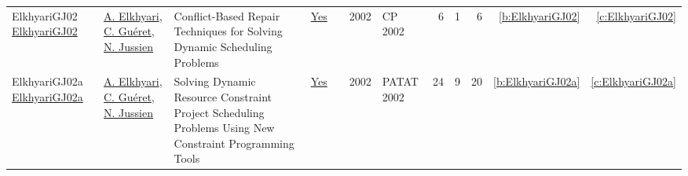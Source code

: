 {\begin{longtable}{>{\raggedright\arraybackslash}p{3cm}>{\raggedright\arraybackslash}p{6cm}>{\raggedright\arraybackslash}p{6.5cm}rrrp{2.5cm}rrrrr}
ElkhyariGJ02 \href{https://doi.org/10.1007/3-540-46135-3\_49}{ElkhyariGJ02} & \hyperref[auth:a295]{A. Elkhyari}, \hyperref[auth:a296]{C. Gu{\'{e}}ret}, \hyperref[auth:a250]{N. Jussien} & Conflict-Based Repair Techniques for Solving Dynamic Scheduling Problems & \href{works/ElkhyariGJ02.pdf}{Yes} & \cite{ElkhyariGJ02} & 2002 & CP 2002 & 6 & 1 & 6 & \ref{b:ElkhyariGJ02} & \ref{c:ElkhyariGJ02}\\
ElkhyariGJ02a \href{https://doi.org/10.1007/978-3-540-45157-0\_3}{ElkhyariGJ02a} & \hyperref[auth:a295]{A. Elkhyari}, \hyperref[auth:a296]{C. Gu{\'{e}}ret}, \hyperref[auth:a250]{N. Jussien} & Solving Dynamic Resource Constraint Project Scheduling Problems Using New Constraint Programming Tools & \href{works/ElkhyariGJ02a.pdf}{Yes} & \cite{ElkhyariGJ02a} & 2002 & PATAT 2002 & 24 & 9 & 20 & \ref{b:ElkhyariGJ02a} & \ref{c:ElkhyariGJ02a}\\
\end{longtable}
}

